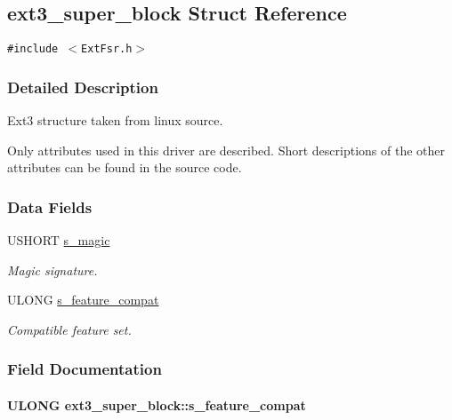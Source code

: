 \hypertarget{structext3__super__block}{
\subsection{ext3\_\-super\_\-block Struct Reference}
\label{structext3__super__block}
}
{\tt \#include $<$Ext\-Fsr.h$>$}



\subsubsection{Detailed Description}
Ext3 structure taken from linux source.

Only attributes used in this driver are described. Short descriptions of the other attributes can be found in the source code. 

\subsubsection*{Data Fields}
\begin{CompactItemize}
\item 
USHORT \hyperlink{structext3__super__block_m15}{s\_\-magic}
\begin{CompactList}\small\item\em Magic signature.\item\end{CompactList}\item 
ULONG \hyperlink{structext3__super__block_m28}{s\_\-feature\_\-compat}
\begin{CompactList}\small\item\em Compatible feature set.\item\end{CompactList}\end{CompactItemize}


\subsubsection{Field Documentation}
\hypertarget{structext3__super__block_m28}{
\paragraph[s\_\-feature\_\-compat]{\setlength{\rightskip}{0pt plus 5cm}ULONG ext3\_\-super\_\-block::s\_\-feature\_\-compat}\hfill}
\label{structext3__super__block_m28}


